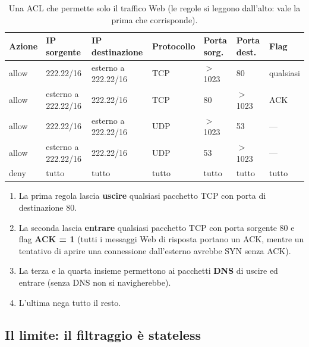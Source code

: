 \begin{table}[H]
\centering
\small
\begin{tabular}{lllllll}
\toprule
\textbf{Azione} & \textbf{IP sorgente} & \textbf{IP destinazione} & \textbf{Protocollo} & \textbf{Porta sorg.} & \textbf{Porta dest.} & \textbf{Flag} \\
\midrule
allow & 222.22/16 & esterno a 222.22/16 & TCP & $>$ 1023 & 80 & qualsiasi \\
allow & esterno a 222.22/16 & 222.22/16 & TCP & 80 & $>$ 1023 & ACK \\
allow & 222.22/16 & esterno a 222.22/16 & UDP & $>$ 1023 & 53 & --- \\
allow & esterno a 222.22/16 & 222.22/16 & UDP & 53 & $>$ 1023 & --- \\
deny & tutto & tutto & tutto & tutto & tutto & tutto \\
\bottomrule
\end{tabular}
\caption{Una ACL che permette solo il traffico Web (le regole si leggono dall'alto: vale la prima che corrisponde).}
\end{table}

\begin{enumerate}
    \item La prima regola lascia \textbf{uscire} qualsiasi pacchetto TCP con porta di destinazione 80.
    \item La seconda lascia \textbf{entrare} qualsiasi pacchetto TCP con porta sorgente 80 e flag \textbf{ACK = 1} (tutti i messaggi Web di risposta portano
          un ACK, mentre un tentativo di aprire una connessione dall'esterno avrebbe SYN senza ACK).
    \item La terza e la quarta insieme permettono ai pacchetti \textbf{DNS} di uscire ed entrare (senza DNS non si navigherebbe).
    \item L'ultima nega tutto il resto.
\end{enumerate}

\subsection{Il limite: il filtraggio è stateless}


